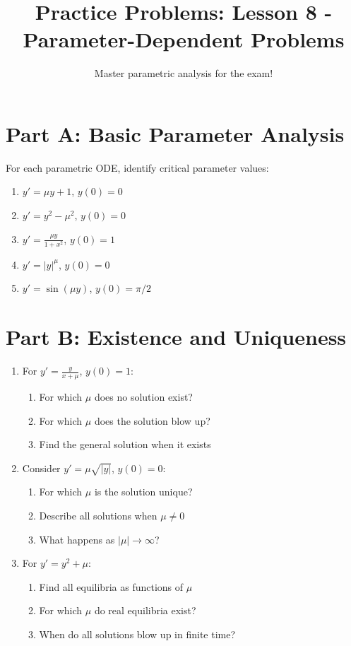 \documentclass[12pt]{article}
\title{Practice Problems: Lesson 8 - Parameter-Dependent Problems}
\author{Master parametric analysis for the exam!}
\date{}
\begin{document}
\maketitle

\section*{Part A: Basic Parameter Analysis}

For each parametric ODE, identify critical parameter values:

\begin{enumerate}
    \item $y' = \mu y + 1$, $y(0) = 0$
    
    \item $y' = y^2 - \mu^2$, $y(0) = 0$
    
    \item $y' = \frac{\mu y}{1 + x^2}$, $y(0) = 1$
    
    \item $y' = |y|^\mu$, $y(0) = 0$
    
    \item $y' = \sin(\mu y)$, $y(0) = \pi/2$
\end{enumerate}

\section*{Part B: Existence and Uniqueness}

\begin{enumerate}[start=6]
    \item For $y' = \frac{y}{x + \mu}$, $y(0) = 1$:
    \begin{enumerate}[label=(\alph*)]
        \item For which $\mu$ does no solution exist?
        \item For which $\mu$ does the solution blow up?
        \item Find the general solution when it exists
    \end{enumerate}
    
    \item Consider $y' = \mu \sqrt{|y|}$, $y(0) = 0$:
    \begin{enumerate}[label=(\alph*)]
        \item For which $\mu$ is the solution unique?
        \item Describe all solutions when $\mu \neq 0$
        \item What happens as $|\mu| \to \infty$?
    \end{enumerate}
    
    \item For $y' = y^2 + \mu$:
    \begin{enumerate}[label=(\alph*)]
        \item Find all equilibria as functions of $\mu$
        \item For which $\mu$ do real equilibria exist?
        \item When do all solutions blow up in finite time?
    \end{enumerate}
\end{enumerate}
\end{document}
